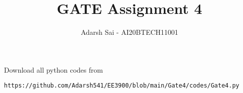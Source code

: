 \documentclass[journal,12pt,twocolumn]{IEEEtran}
\DeclareMathOperator*{\Res}{Res}
\begin{document}
\newcommand{\BEQA}{\begin{eqnarray}}
\newcommand{\EEQA}{\end{eqnarray}}
\newcommand{\define}{\stackrel{\triangle}{=}}

\raggedbottom
\setlength{\parindent}{0pt}
\providecommand{\mbf}{\mathbf}
\providecommand{\pr}[1]{\ensuremath{\Pr\left(#1\right)}}
\providecommand{\qfunc}[1]{\ensuremath{Q\left(#1\right)}}
\providecommand{\sbrak}[1]{\ensuremath{{}\left[#1\right]}}
\providecommand{\lsbrak}[1]{\ensuremath{{}\left[#1\right.}}
\providecommand{\rsbrak}[1]{\ensuremath{{}\left.#1\right]}}
\providecommand{\brak}[1]{\ensuremath{\left(#1\right)}}
\providecommand{\lbrak}[1]{\ensuremath{\left(#1\right.}}
\providecommand{\rbrak}[1]{\ensuremath{\left.#1\right)}}
\providecommand{\cbrak}[1]{\ensuremath{\left\{#1\right\}}}
\providecommand{\lcbrak}[1]{\ensuremath{\left\{#1\right.}}
\providecommand{\rcbrak}[1]{\ensuremath{\left.#1\right\}}}
\theoremstyle{remark}
\newtheorem{rem}{Remark}
\newcommand{\sgn}{\mathop{\mathrm{sgn}}}
\providecommand{\abs}[1]{\vert#1\vert}
\providecommand{\res}[1]{\Res\displaylimits_{#1}} 
\providecommand{\norm}[1]{\lVert#1\rVert}
\providecommand{\mtx}[1]{\mathbf{#1}}
\providecommand{\mean}[1]{E[ #1 ]}
\providecommand{\fourier}{\overset{\mathcal{F}}{ \rightleftharpoons}}
\providecommand{\system}{\overset{\mathcal{H}}{ \longleftrightarrow}}
\newcommand{\solution}{\noindent \textbf{Solution: }}
\newcommand{\cosec}{\,\text{cosec}\,}
\providecommand{\dec}[2]{\ensuremath{\overset{#1}{\underset{#2}{\gtrless}}}}
\newcommand{\myvec}[1]{\ensuremath{\begin{pmatrix}#1\end{pmatrix}}}
\newcommand{\mydet}[1]{\ensuremath{\begin{vmatrix}#1\end{vmatrix}}}
\makeatletter
{}
\makeatother
\let\StandardTheFigure\thefigure
\let\vec\mathbf
\renewcommand{\thefigure}{\theproblem}
\def\putbox#1#2#3{\makebox[0in][l]{\makebox[#1][l]{}\raisebox{\baselineskip}[0in][0in]{\raisebox{#2}[0in][0in]{#3}}}}
     \def\rightbox#1{\makebox[0in][r]{#1}}
     \def\centbox#1{\makebox[0in]{#1}}
     \def\topbox#1{\raisebox{-\baselineskip}[0in][0in]{#1}}
     \def\midbox#1{\raisebox{-0.5\baselineskip}[0in][0in]{#1}}
\vspace{3cm}
\title{GATE Assignment 4}
\author{Adarsh Sai - AI20BTECH11001}
\maketitle
\newpage
\bigskip
\renewcommand{\thefigure}{\theenumi}
\renewcommand{\thetable}{\theenumi}
Download all python codes from 
\begin{lstlisting}
https://github.com/Adarsh541/EE3900/blob/main/Gate4/codes/Gate4.py
\end{lstlisting}
\end{document}
